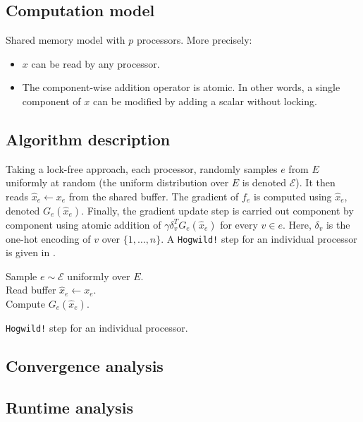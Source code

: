 \documentclass[twoside,11pt]{article}
\newcommand{\todo}[1]{\textbf{\color{red}{[TODO: #1]}}}
\begin{document}
\subsection{Computation model}
Shared memory model with $p$ processors. More precisely:
\begin{itemize}
    \item $x$ can be read by any processor.
    \item The component-wise addition operator is atomic. In other words, a single component of $x$ can be modified by adding a scalar without locking.
\end{itemize}

\subsection{Algorithm description}
Taking a lock-free approach, each processor, randomly samples $e$ from $E$ uniformly at random (the uniform distribution over $E$ is denoted $\mathcal E$). It then reads $\hat x_e \leftarrow x_e$ from the shared buffer. The gradient of $f_e$ is computed using $\hat x_e$, denoted $G_e(\hat x_e)$. Finally, the gradient update step is carried out component by component using atomic addition of $\gamma \delta_v^TG_e(\hat x_e)$ for every $v \in e$. Here, $\delta_v$ is the one-hot encoding of $v$ over
$\lbrace{1, \ldots, n\rbrace}$. A \texttt{Hogwild!} step for an individual processor is given in .


\begin{algorithm}[ht]
\SetAlgoLined
{}
Sample $e\sim\mathcal E$ uniformly over $E$.\\
Read buffer $\hat x_e \leftarrow x_e$.\\
Compute $G_e(\hat x_e)$.\\
\caption{\texttt{Hogwild!} step for an individual processor.}
\label{alg:hogwild-step}
\end{algorithm}

\subsection{Convergence analysis}
\todo{}

\subsection{Runtime analysis}
\todo{}
\end{document}
